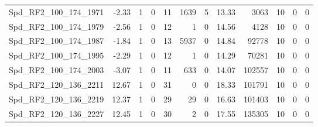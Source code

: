 \begin{longtable}[c]{@{}lrrrrrrrrrrr@{}}
Spd\_RF2\_100\_174\_1971     & -2.33                  & 1                       & 0                       & 11                     & 1639                    & 5                       & 13.33                   & 3063                     & 10                       & 0                        & 0                        \\
Spd\_RF2\_100\_174\_1979     & -2.56                  & 1                       & 0                       & 12                     & 1                       & 0                       & 14.56                   & 4128                     & 10                       & 0                        & 0                        \\
Spd\_RF2\_100\_174\_1987     & -1.84                  & 1                       & 0                       & 13                     & 5937                    & 0                       & 14.84                   & 92778                    & 10                       & 0                        & 0                        \\
Spd\_RF2\_100\_174\_1995     & -2.29                  & 1                       & 0                       & 12                     & 1                       & 0                       & 14.29                   & 70281                    & 10                       & 0                        & 0                        \\
Spd\_RF2\_100\_174\_2003     & -3.07                  & 1                       & 0                       & 11                     & 633                     & 0                       & 14.07                   & 102557                   & 10                       & 0                        & 0                        \\
Spd\_RF2\_120\_136\_2211     & 12.67                  & 1                       & 0                       & 31                     & 0                       & 0                       & 18.33                   & 101791                   & 10                       & 0                        & 0                        \\
Spd\_RF2\_120\_136\_2219     & 12.37                  & 1                       & 0                       & 29                     & 29                      & 0                       & 16.63                   & 101403                   & 10                       & 0                        & 0                        \\
Spd\_RF2\_120\_136\_2227     & 12.45                  & 1                       & 0                       & 30                     & 2                       & 0                       & 17.55                   & 135305                   & 10                       & 0                        & 0                        \\

\end{longtable}
